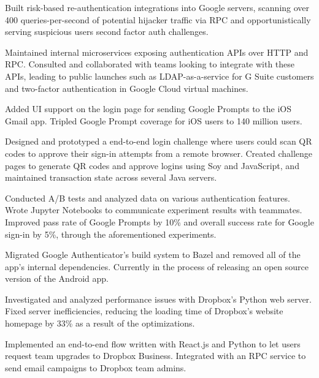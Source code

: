\documentclass[]{template}
\begin{document}
\hfill
{}
\begin{tightemize}
\item
  Built risk-based re-authentication integrations into Google servers, scanning
  over 400 queries-per-second of potential hijacker traffic via RPC and
  opportunistically serving suspicious users second factor auth challenges.
\item
  Maintained internal microservices exposing authentication APIs over HTTP and
  RPC. Consulted and collaborated with teams looking to integrate with these
  APIs, leading to public launches such as LDAP-as-a-service for G Suite
  customers and two-factor authentication in Google Cloud virtual machines.
\item
  Added UI support on the login page for sending Google Prompts to the iOS Gmail
  app. Tripled Google Prompt coverage for iOS users to 140 million users.
\item
  Designed and prototyped a end-to-end login challenge where users could scan QR
  codes to approve their sign-in attempts from a remote browser. Created
  challenge pages to generate QR codes and approve logins using Soy and
  JavaScript, and maintained transaction state across several Java servers.
\item
  Conducted A/B tests and analyzed data on various authentication features.
  Wrote Jupyter Notebooks to communicate experiment results with teammates.
  Improved pass rate of Google Prompts by 10\% and overall success rate for
  Google sign-in by 5\%, through the aforementioned experiments.
\item
  Migrated Google Authenticator's build system to Bazel and removed all of the
  app's internal dependencies. Currently in the process of releasing an open
  source version of the Android app.
\item
\end{tightemize}

\sectionsep

\hfill
{}
\begin{tightemize}
\item
  Investigated and analyzed performance issues with Dropbox's Python web server.
  Fixed server inefficiencies, reducing the loading time of Dropbox's
  website homepage by 33\% as a result of the optimizations.
\item
  Implemented an end-to-end flow written with React.js and Python to let users
  request team upgrades to Dropbox Business. Integrated with an RPC service to
  send email campaigns to Dropbox team admins.
\item
\end{tightemize}
\end{document}
